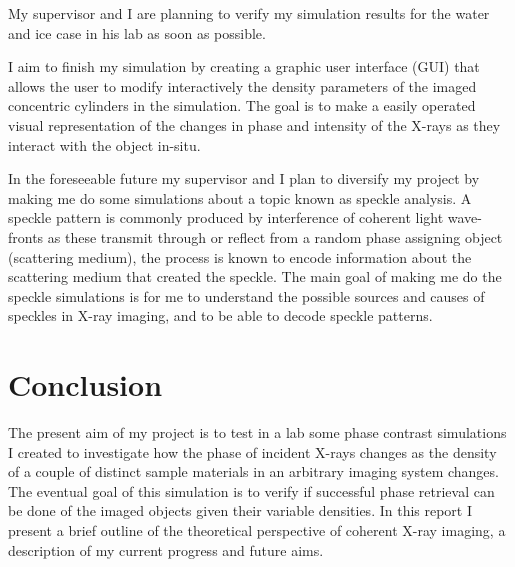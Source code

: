 \documentclass[9pt, a4paper]{article}
\begin{document}
My supervisor and I are planning to verify my simulation results for the water and ice case in his lab as soon as possible.

I aim to finish my simulation by creating a graphic user interface (GUI) that allows the user to modify interactively the density parameters of the imaged concentric cylinders in the simulation. The goal is to make a easily operated visual representation of the changes in phase and intensity of the X-rays as they interact with the object in-situ.

In the foreseeable future my supervisor and I plan to diversify my project by making me do some simulations about a topic known as speckle analysis. A speckle pattern is commonly produced by interference of coherent light wave-fronts as these transmit through or reflect from a random phase assigning object (scattering medium), the process is known to encode information about the scattering medium that created the speckle\cite{Specks}. The main goal of making me do the speckle simulations is for me to understand the possible sources and causes of speckles in X-ray imaging, and to be able to decode speckle patterns.


\section{Conclusion}
The present aim of my project is to test in a lab some phase contrast simulations I created to investigate how the phase of incident X-rays changes as the density of a couple of distinct sample materials in an arbitrary imaging system changes. The eventual goal of this simulation is to verify if successful phase retrieval can be done of the imaged objects given their variable densities. In this report I present a brief outline of the theoretical perspective of coherent X-ray imaging, a description of my current progress and future aims.



\end{document}
